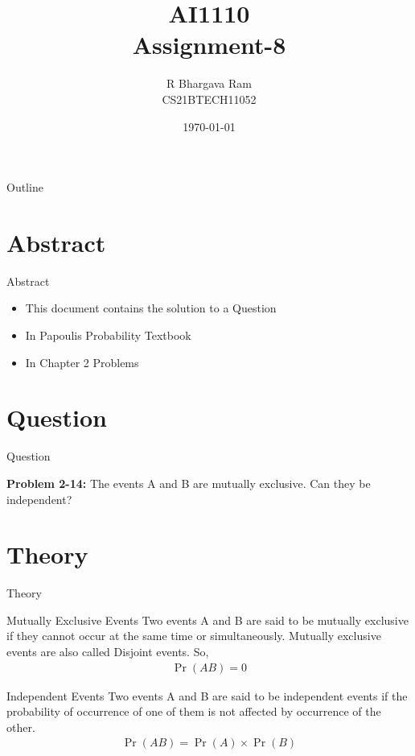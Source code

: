 \documentclass{beamer}
\title{AI1110 \\ Assignment-8}
\author{R Bhargava Ram \\ CS21BTECH11052}
\date{\today}
\providecommand{\pr}[1]{\ensuremath{\Pr\left(#1\right)}}
\begin{document}
\begin{frame}
    \titlepage 
\end{frame}

\logo{}


\begin{frame}{Outline}
    \tableofcontents
\end{frame}

\section{Abstract}
	\begin{frame}{Abstract}
		\begin{itemize}
			\item This document contains the solution to a Question
			\item In Papoulis Probability Textbook
			\item In Chapter 2 Problems
		\end{itemize}
		
	\end{frame}


\section{Question}
    \begin{frame}{Question}
       \begin{block}{\textbf{ Problem 2-14:}}
 			The events A and B are mutually exclusive. Can they be independent?
       \end{block}
         
    \end{frame}


\section{Theory}
	\begin{frame}{Theory}
			\begin{block}{Mutually Exclusive Events}
			   Two events A and B are said to be mutually exclusive if they cannot occur at the same time or simultaneously. Mutually exclusive events are also called Disjoint events. So,
			    \begin{align}
				    \pr{AB} = 0
			    \end{align}
		    \end{block}	
		    
	     
		    \begin{block}{Independent Events}
			   Two events A and B are said to be independent events if the probability of occurrence of one of them is not affected by occurrence of the other.
			   \begin{align}
				   \pr{AB}=\pr{A} \times \pr{B}
			   \end{align}
		    \end{block}  
		
	\end{frame}
	
\end{document}
